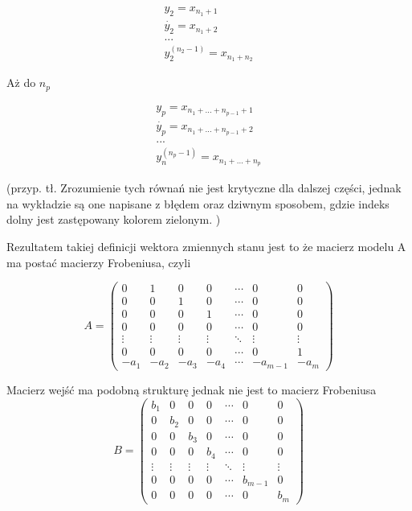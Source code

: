 \documentclass{article}
\begin{document}
			\begin{align*}
				 y_{2} = x_{n_{1}+1} \\
				 \dot{y_{2}} = x_{n_{1}+2} \\
				... \\
				 y_{2}^{(n_{2}-1)} = x_{n_{1}+n_{2}}
			\end{align*}

		Aż do $ n_{p} $

			\begin{align*}
				 y_{p} = x_{n_{1}+...+n_{p-1} + 1}  \\
				 \dot{y_{p}} = x_{n_{1}+...+n_{p-1} + 2}  \\
				... \\
				 y_{n}^{(n_{p}-1)} = x_{n_{1}+...+n_{p}}
			\end{align*}


		(przyp. tł. Zrozumienie tych równań nie jest krytyczne dla dalszej części,
		jednak na wykładzie są one napisane z błędem oraz dziwnym sposobem, gdzie
		indeks dolny jest zastępowany kolorem zielonym. )

		Rezultatem takiej definicji wektora zmiennych stanu jest to że macierz modelu A
		ma postać macierzy Frobeniusa, czyli

		\begin{equation}
			A=\begin{pmatrix}
			  0    &   1    &   0    &   0    & \cdots &   0      &   0    \\
			  0    &   0    &   1    &   0    & \cdots &   0      &   0    \\
			  0    &   0    &   0    &   1    & \cdots &   0      &   0    \\
			  0    &   0    &   0    &   0    & \cdots &   0      &   0    \\
			\vdots & \vdots & \vdots & \vdots & \ddots & \vdots   & \vdots \\
			  0    &   0    &   0    &   0    & \cdots &   0      &   1    \\
			 -a_{1}&  -a_{2}&  -a_{3}&  -a_{4}& \cdots & -a_{m-1} & -a_{m}
			\end{pmatrix}
		\end{equation}

		Macierz wejść ma podobną strukturę jednak nie jest to macierz Frobeniusa
		\begin{equation}
			B=\begin{pmatrix}
			  b_{1} &   0    &   0    &   0    & \cdots &   0      &   0    \\
			  0     &  b_{2} &   0    &   0    & \cdots &   0      &   0    \\
			  0     &   0    & b_{3}  &   0    & \cdots &   0      &   0    \\
			  0     &   0    &   0    &  b_{4} & \cdots &   0      &   0    \\
			\vdots  & \vdots & \vdots & \vdots & \ddots & \vdots   & \vdots \\
			  0     &   0    &   0    &   0    & \cdots &  b_{m-1} &   0    \\
			  0     &   0    &   0    &   0    & \cdots &   0      &   b_{m}
			\end{pmatrix}
		\end{equation}
\end{document}

